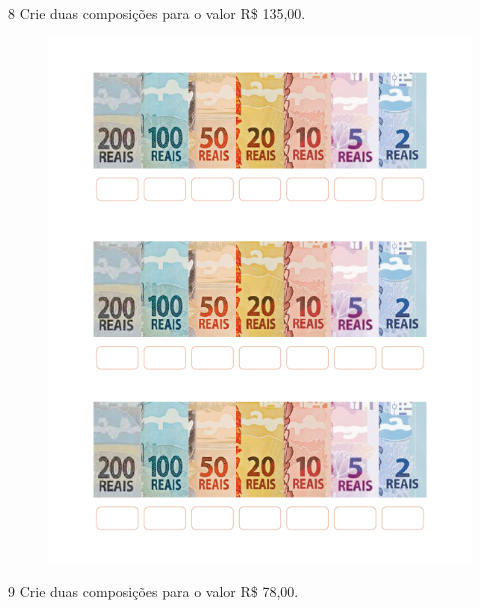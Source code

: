 

\pagebreak
\num{8} Crie duas composições para o valor R\$ 135,00.

\begin{figure}[htpb!]
\includegraphics[width=.9\textwidth]{./media/image69.png}
\end{figure}



\pagebreak
\num{9} Crie duas composições para o valor R\$ 78,00.

